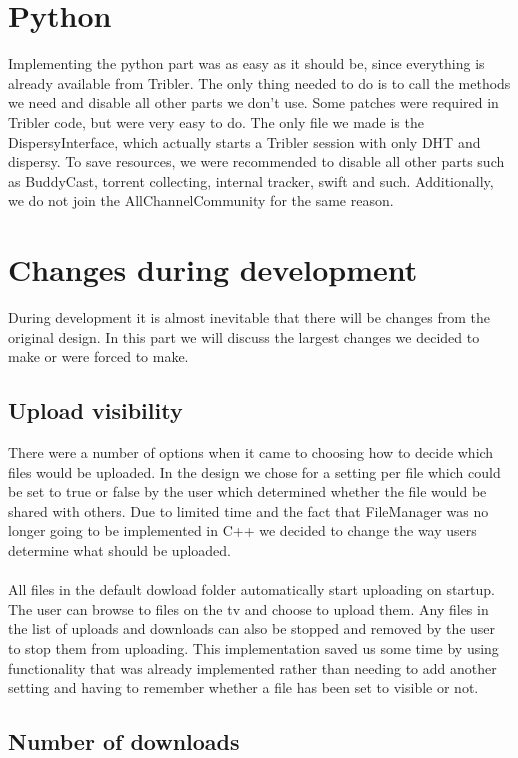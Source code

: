 \section{Python}
Implementing the python part was as easy as it should be, since everything is already available from Tribler. The only thing needed to do is to call the methods we need and disable all other parts we don't use. Some patches were required in Tribler code, but were very easy to do.
The only file we made is the DispersyInterface, which actually starts a Tribler session with only DHT and dispersy. To save resources, we were recommended to disable all other parts such as BuddyCast, torrent collecting, internal tracker, swift and such. Additionally, we do not join the AllChannelCommunity for the same reason.

\section{Changes during development}

During development it is almost inevitable that there will be changes from the original design. In this part we will discuss the largest changes we decided to make or were forced to make.

\subsection{Upload visibility}

There were a number of options when it came to choosing how to decide which files would be uploaded. In the design we chose for a setting per file which could be set to true or false by the user which determined whether the file would be shared with others. Due to limited time and the fact that FileManager was no longer going to be implemented in C++ we decided to change the way users determine what should be uploaded.
\\\\
All files in the default dowload folder automatically start uploading on startup. The user can browse to files on the tv and choose to upload them. Any files in the list of uploads and downloads can also be stopped and removed by the user to stop them from uploading. This implementation saved us some time by using functionality that was already implemented rather than needing to add another setting and having to remember whether a file has been set to visible or not.

\subsection{Number of downloads}

